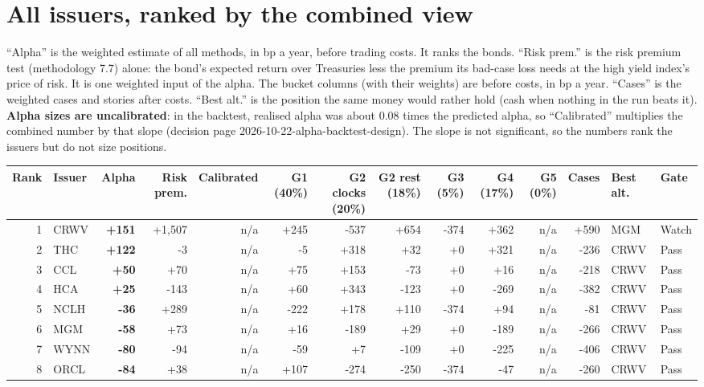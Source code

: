 \documentclass[11pt,a4paper]{article}
\begin{document}
\section*{All issuers, ranked by the combined view}
``Alpha'' is the weighted estimate of all methods, in bp a year, before trading costs. It ranks the bonds. ``Risk prem.'' is the risk premium test (methodology 7.7) alone: the bond's expected return over Treasuries less the premium its bad-case loss needs at the high yield index's price of risk. It is one weighted input of the alpha. The bucket columns (with their weights) are before costs, in bp a year. ``Cases'' is the weighted cases and stories after costs. ``Best alt.'' is the position the same money would rather hold (cash when nothing in the run beats it). \textbf{Alpha sizes are uncalibrated}: in the backtest, realised alpha was about 0.08 times the predicted alpha, so ``Calibrated'' multiplies the combined number by that slope (decision page 2026-10-22-alpha-backtest-design). The slope is not significant, so the numbers rank the issuers but do not size positions.
\begin{center}\scriptsize\setlength{\tabcolsep}{2pt}\begin{tabular}{@{}rlrrrrrrrrrrll@{}}\toprule
Rank & Issuer & Alpha & Risk prem. & Calibrated & G1 (40\%) & G2 clocks (20\%) & G2 rest (18\%) & G3 (5\%) & G4 (17\%) & G5 (0\%) & Cases & Best alt. & Gate \\\midrule
1 & CRWV & \textbf{+151} & +1,507 & n/a & +245 & -537 & +654 & -374 & +362 & n/a & +590 & MGM & Watch \\
2 & THC & \textbf{+122} & -3 & n/a & -5 & +318 & +32 & +0 & +321 & n/a & -236 & CRWV & Pass \\
3 & CCL & \textbf{+50} & +70 & n/a & +75 & +153 & -73 & +0 & +16 & n/a & -218 & CRWV & Pass \\
4 & HCA & \textbf{+25} & -143 & n/a & +60 & +343 & -123 & +0 & -269 & n/a & -382 & CRWV & Pass \\
5 & NCLH & \textbf{-36} & +289 & n/a & -222 & +178 & +110 & -374 & +94 & n/a & -81 & CRWV & Pass \\
6 & MGM & \textbf{-58} & +73 & n/a & +16 & -189 & +29 & +0 & -189 & n/a & -266 & CRWV & Pass \\
7 & WYNN & \textbf{-80} & -94 & n/a & -59 & +7 & -109 & +0 & -225 & n/a & -406 & CRWV & Pass \\
8 & ORCL & \textbf{-84} & +38 & n/a & +107 & -274 & -250 & -374 & -47 & n/a & -260 & CRWV & Pass \\
\bottomrule\end{tabular}\end{center}
\end{document}
